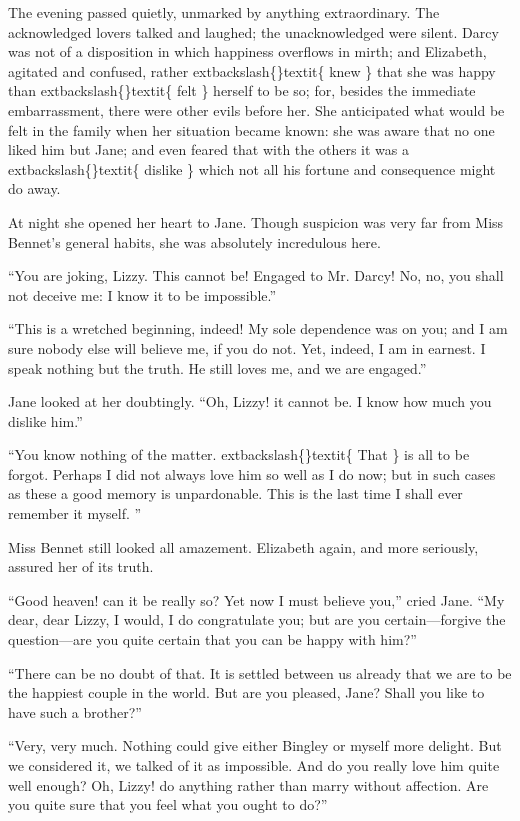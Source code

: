 \documentclass[10pt]{book}
\begin{document}
   The evening passed quietly, unmarked by anything extraordinary. The
acknowledged lovers talked and laughed; the unacknowledged were silent.
Darcy was not of a disposition in which happiness overflows in mirth;
and Elizabeth, agitated and confused, rather
   	extbackslash\{\}textit\{
    knew
   \}
   that she was happy
than
   	extbackslash\{\}textit\{
    felt
   \}
   herself to be so; for, besides the immediate embarrassment,
there were other evils before her. She anticipated what would be felt in
the family when her situation became known: she was aware that no one
liked him but Jane; and even feared that with the others it was a
   	extbackslash\{\}textit\{
    dislike
   \}
   which not all his fortune and consequence might do away.
  

   At night she opened her heart to Jane. Though suspicion was very far
from Miss Bennet’s general habits, she was absolutely incredulous here.
  

   “You are joking, Lizzy. This cannot be! Engaged to Mr. Darcy! No, no,
you shall not deceive me: I know it to be impossible.”
  

   “This is a wretched beginning, indeed! My sole dependence was on you;
and I am sure nobody else will believe me, if you do not. Yet, indeed, I
am in earnest. I speak nothing but the truth. He still loves me, and we
are engaged.”
  

   Jane looked at her doubtingly. “Oh, Lizzy! it cannot be. I know how much
you dislike him.”
  

   “You know nothing of the matter.
   	extbackslash\{\}textit\{
    That
   \}
   is all to be forgot. Perhaps I
did not always love him so well as I do now; but in such cases as these
a good memory is unpardonable. This is the last time I shall ever
remember it myself.
   ”
  

   Miss Bennet still looked all amazement. Elizabeth again, and more
seriously, assured her of its truth.
  

   “Good heaven! can it be really so? Yet now I must believe you,” cried
Jane. “My dear, dear Lizzy, I would, I do congratulate you; but are you
certain—forgive the question—are you quite certain that you can be
happy with him?”
  

   “There can be no doubt of that. It is settled between us already that we
are to be the happiest couple in the world. But are you pleased, Jane?
Shall you like to have such a brother?”
  

   “Very, very much. Nothing could give either Bingley or myself more
delight. But we considered it, we talked of it as impossible. And do you
really love him quite well enough? Oh, Lizzy! do anything rather than
marry without affection. Are you quite sure that you feel what you ought
to do?”
  
\end{document}
